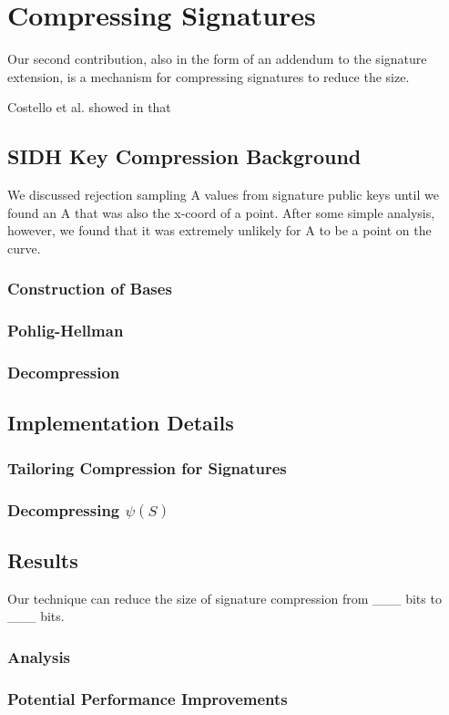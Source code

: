 \chapter{Compressing Signatures}
\label{sec:compress}

Our second contribution, also in the form of an addendum to the \sidh signature extension, is a mechanism for compressing signatures to reduce the size.

Costello et al. showed in \cite{pkcomp} that  

\section{SIDH Key Compression Background}

We discussed rejection sampling A values from signature public keys until we found an A that was also the x-coord of a point. After some simple analysis, however, we found that it was extremely unlikely for A to be a point on the curve.

\subsection{Construction of Bases}

\subsection{Pohlig-Hellman}

\subsection{Decompression}

\section{Implementation Details}

\subsection{Tailoring Compression for Signatures}

\subsection{Decompressing $\psi(S)$}

\section{Results}

Our technique can reduce the size of \sidh signature compression from \_\_\_ bits to \_\_\_ bits.

\subsection{Analysis}

\subsection{Potential Performance Improvements}

